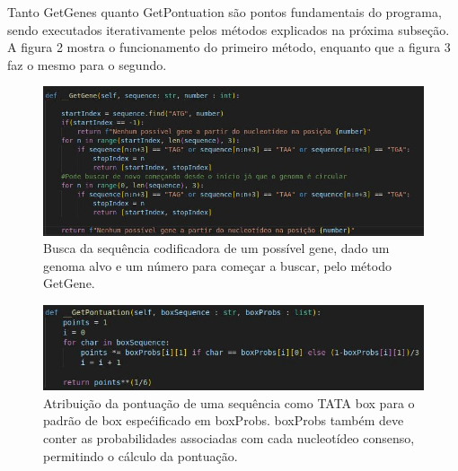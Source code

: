 \documentclass[brazilian,12pt,a4paper,final]{article}
\begin{document}
	Tanto GetGenes quanto GetPontuation são pontos fundamentais do programa, sendo executados iterativamente pelos métodos explicados na próxima subseção.
	A figura 2 mostra o funcionamento do primeiro método, enquanto que a figura 3 faz o mesmo para o segundo.
	
	\begin{figure}[hbtp]
		\begin{center}
			\includegraphics[]{GetGene.jpg}
			\caption{Busca da sequência codificadora de um possível gene, dado um genoma alvo e um número para começar a buscar, pelo método GetGene.}
			\label{fig}
		\end{center}
	\end{figure}

\begin{figure}[hbtp]
	\begin{center}
		\includegraphics[]{GetPontuation.jpg}
		\caption{Atribuição da pontuação de uma sequência como TATA box para o padrão de box espećificado em boxProbs. boxProbs também deve conter as probabilidades associadas com cada nucleotídeo consenso, permitindo o cálculo da pontuação.}
		\label{fig}
	\end{center}
\end{figure}
\end{document}

